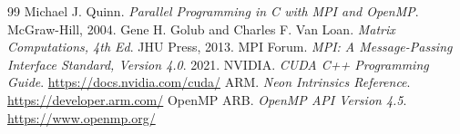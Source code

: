 \documentclass[a4paper]{article}
\begin{document}
\renewcommand{\refname}{参考文献}
\begin{thebibliography}{99}
 Michael J. Quinn. \textit{Parallel Programming in C with MPI and OpenMP}. McGraw-Hill, 2004.
 Gene H. Golub and Charles F. Van Loan. \textit{Matrix Computations, 4th Ed}. JHU Press, 2013.
 MPI Forum. \textit{MPI: A Message-Passing Interface Standard, Version 4.0}. 2021.
 NVIDIA. \textit{CUDA C++ Programming Guide}. \url{https://docs.nvidia.com/cuda/}
 ARM. \textit{Neon Intrinsics Reference}. \url{https://developer.arm.com/}
 OpenMP ARB. \textit{OpenMP API Version 4.5}. \url{https://www.openmp.org/}
\end{thebibliography}
\end{document}
